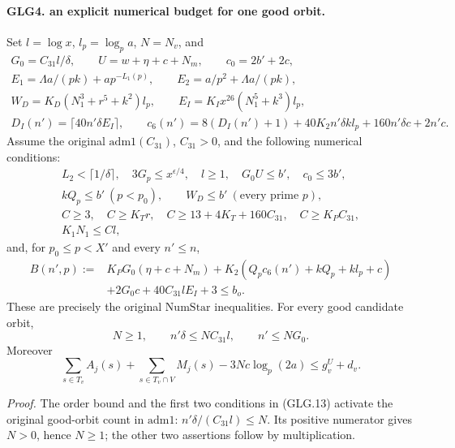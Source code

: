 \paragraph{GLG4. an explicit numerical budget for one good orbit.}
\label{claim:GLG4}
Set \(l=\log x\), \(l_p=\log_p a\), \(N=N_v\), and
\[
 \begin{gathered}
 G_0=C_{31}l/\delta,\qquad U=w+\eta+c+N_m,\qquad c_0=2b'+2c,\\
 E_1=\Lambda a/(pk)+ap^{-L_1(p)},\qquad
 E_2=a/p^2+\Lambda a/(pk),\\
 W_D=K_D(N_1^3+r^5+k^2)l_p,\qquad
 E_I=K_Ix^{26}(N_1^5+k^3)l_p,\\
 D_I(n')=\lceil40n'\delta E_I\rceil,\qquad
 c_6(n')=8(D_I(n')+1)+40K_2n'\delta k l_p
                       +160n'\delta c+2n'c .
 \end{gathered}                                                     \tag{GLG.12}
\]
Assume the original \(\mathrm{adm1}(C_{31})\), \(C_{31}>0\), and
the following numerical conditions:
\[
 \begin{gathered}
 L_2<\lceil1/\delta\rceil,\quad 3G_p\le x^{\epsilon/4},
 \quad l\ge1,\quad G_0U\le b',\quad c_0\le3b',\\
 kQ_p\le b'\ (p<p_0),\qquad W_D\le b'\ (\text{every prime }p),\\
 C\ge3,\quad C\ge K_Tr,\quad
 C\ge13+4K_T+160C_{31},\quad C\ge K_PC_{31},\\
 K_1N_1\le Cl ,
 \end{gathered}                                                     \tag{GLG.13}
\]
and, for \(p_0\le p<X'\) and every \(n'\le n\),
\[
 \begin{split}
 B(n',p):={}&K_PG_0(\eta+c+N_m)
       +K_2(Q_pc_6(n')+kQ_p+kl_p+c)\\
       &+2G_0c+40C_{31}lE_I+3\le b_o .
 \end{split}                                                       \tag{GLG.14}
\]
These are precisely the original \(\mathrm{NumStar}\) inequalities.
For every good candidate orbit,
\[
              N\ge1,\qquad n'\delta\le NC_{31}l,\qquad n'\le NG_0 .
                                                                    \tag{GLG.15}
\]
Moreover
\[
 \sum_{s\in T_v}A_j(s)+\sum_{s\in T_v\cap V}M_j(s)
                  -3Nc\log_p(2a)\le g_v^U+d_v .                   \tag{GLG.16}
\]

\emph{Proof.}
The order bound and the first two conditions in (GLG.13) activate
the original good-orbit count in \(\mathrm{adm1}\):
\(n'\delta/(C_{31}l)\le N\).
Its positive numerator gives \(N>0\), hence \(N\ge1\);
the other two assertions follow by multiplication.

